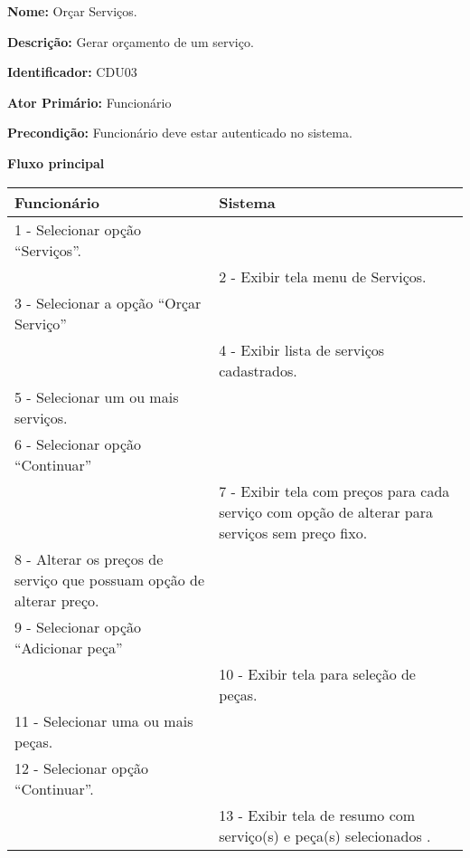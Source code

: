 \par
\textbf{Nome:} Orçar Serviços.
\par
\textbf{Descrição:} Gerar orçamento de um serviço. 
\par 
\textbf{Identificador:} CDU03
\par
\textbf{Ator Primário:} Funcionário	
\par
\textbf{Precondição:} Funcionário deve estar autenticado no sistema.
\par	
\par
\textbf{Fluxo principal}\par
\begin{tabular}{|p{7cm}|p{7cm}|}
	\hline 
	Funcionário & Sistema \\ 
	\hline 
	
	
	1 - Selecionar opção “Serviços”. 
	&  \\ 
	\hline 
	& 
	
	2 - Exibir tela menu de Serviços.
	\\ 
	\hline 
	
	
	3 - Selecionar a opção “Orçar Serviço”
	&  \\ 
	\hline 
	& 
	
	4 - Exibir lista de serviços cadastrados.
	\\ 
	\hline 
	
	
	5 - Selecionar um ou mais serviços.
	&  \\ 
	\hline 
	
	
	6 - Selecionar opção “Continuar”
	&  \\ 
	\hline 
	& 
	
	7 - Exibir tela com preços para cada serviço com opção de alterar para serviços sem preço fixo. 
	\\ 
	\hline 
	
	
	8 - Alterar os preços de serviço que possuam opção de alterar preço.
	&  \\ 
	\hline 
	
	
	9 - Selecionar opção “Adicionar peça”
	&  \\ 
	\hline 
	& 
	
	10 - Exibir tela para seleção de peças. 
	\\ 
	\hline 
	
	
	11 - Selecionar uma ou mais peças.
	&  \\ 
	\hline 
	
	
	12 - Selecionar opção “Continuar”.
	&  \\ 
	\hline 
	& 
	
	13 - Exibir tela de resumo com serviço(s) e peça(s) selecionados .
	\\ 
	\hline 
	

\end{tabular}

